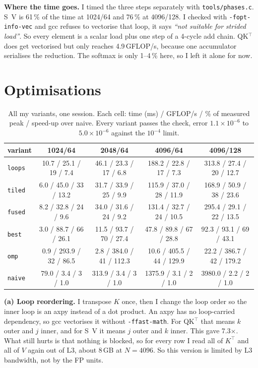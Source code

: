 \documentclass[10pt,a4paper]{article}
\newcommand{\code}[1]{\texttt{\small #1}}
\newcommand{\var}[1]{\texttt{#1}}
\begin{document}
\textbf{Where the time goes.} I timed the three steps separately with
\var{tools/phases.c}. S~V is 61\,\% of
the time at 1024/64 and 76\,\% at
4096/128. I checked with \code{-fopt-info-vec} and gcc refuses to vectorise that
loop, it says \emph{``not suitable for strided load''}. So every element is a
scalar load plus one step of a 4-cycle add chain. QK$^\top$ does get vectorised
but only reaches 4.9\,GFLOP/s,
because one accumulator serialises the reduction. The softmax is only 1--4\,\%
here, so I left it alone for now.

\section{Optimisations}

\begin{table}[htbp]
\centering\scriptsize
\caption{All my variants, one session. Each cell: time (ms) / GFLOP/s / \% of
measured peak / speed-up over naive. Every variant passes the check, error
$1.1\times10^{-6}$ to $5.0\times10^{-6}$ against the $10^{-4}$ limit.}
\label{tab:all}
\begin{tabular}{@{}lcccc@{}}
\toprule
variant & 1024/64 & 2048/64 & 4096/64 & 4096/128 \\
\midrule
\texttt{loops} &   10.7 / 25.1 /  19 /  7.4 &   46.1 / 23.3 /  17 /  6.8 &  188.2 / 22.8 /  17 /  7.3 &  313.8 / 27.4 /  20 / 12.7 \\
\texttt{tiled} &    6.0 / 45.0 /  33 / 13.2 &   31.7 / 33.9 /  25 /  9.9 &  115.9 / 37.0 /  28 / 11.9 &  168.9 / 50.9 /  38 / 23.6 \\
\texttt{fused} &    8.2 / 32.8 /  24 /  9.6 &   34.0 / 31.6 /  24 /  9.2 &  131.4 / 32.7 /  24 / 10.5 &  295.4 / 29.1 /  22 / 13.5 \\
\texttt{best} &    3.0 / 88.7 /  66 / 26.1 &   11.5 / 93.7 /  70 / 27.4 &   47.8 / 89.8 /  67 / 28.8 &   92.3 / 93.1 /  69 / 43.1 \\
\texttt{omp} &    0.9 / 293.9 /  32 / 86.5 &    2.8 / 384.0 /  41 / 112.3 &   10.6 / 405.5 /  44 / 129.9 &   22.2 / 386.7 /  42 / 179.2 \\
\midrule
\texttt{naive} &   79.0 /  3.4 /   3 /  1.0 &  313.9 /  3.4 /   3 /  1.0 & 1375.9 /  3.1 /   2 /  1.0 & 3980.0 /  2.2 /   2 /  1.0 \\
\bottomrule
\end{tabular}
\end{table}

\textbf{(a) Loop reordering.} I transpose $K$ once, then I change the loop order
so the inner loop is an axpy instead of a dot product. An axpy has no
loop-carried dependency, so gcc vectorises it without \code{-ffast-math}. For
QK$^\top$ that means $k$ outer and $j$ inner, and for S~V it means $j$ outer and
$k$ inner.
This gave 7.3$\times$. What still hurts is that
nothing is blocked, so for every row I read all of $K^{\top}$ and all of $V$ again
out of L3, about 8\,GB at $N{=}4096$. So this version is limited by L3 bandwidth,
not by the FP units.
\end{document}
